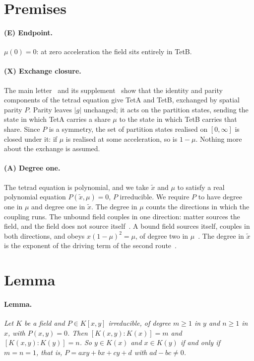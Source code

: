 \documentclass[twocolumn]{iopjournal}
\begin{document}
\section*{Premises}

\paragraph{(E) Endpoint.} $\mu(0) = 0$: at zero acceleration the
field sits entirely in TetB.

\paragraph{(X) Exchange closure.} The main
letter~\cite{Nelson2026geometry} and its
supplement~\cite{Nelson2026scheme} show that the identity and parity
components of the tetrad equation give TetA and TetB, exchanged by
spatial parity $P$. Parity leaves $|g|$ unchanged; it acts on the
partition states, sending the state in which TetA carries a share
$\mu$ to the state in which TetB carries that share. Since $P$ is a
symmetry, the set of partition states realised on $[0,\infty]$ is
closed under it: if $\mu$ is realised at some acceleration, so is
$1 - \mu$. Nothing more about the exchange is assumed.

\paragraph{(A) Degree one.} The tetrad equation is polynomial, and
we take $\tilde x$ and $\mu$ to satisfy a real polynomial equation
$P(\tilde x, \mu) = 0$, $P$ irreducible. We
require $P$ to have degree one in $\mu$ and degree one in
$\tilde x$. The degree in $\mu$ counts the directions in which the
coupling runs. The unbound field couples in one direction: matter
sources the field, and the field does not source
itself~\cite{Nelson2026bound}. A bound field sources itself, couples
in both directions, and obeys $x(1-\mu)^2 = \mu$, of degree two in
$\mu$~\cite{Nelson2026bound}. The degree in $\tilde x$ is the
exponent of the driving term of the second
route~\cite{Nelson2026equilibrium}.


\section*{Lemma}

\paragraph{Lemma.} \textit{Let $K$ be a field and $P \in K[x,y]$
irreducible, of degree $m \ge 1$ in $y$ and $n \ge 1$ in $x$, with
$P(x,y) = 0$. Then $[K(x,y):K(x)] = m$ and $[K(x,y):K(y)] = n$. So
$y \in K(x)$ and $x \in K(y)$ if and only if $m = n = 1$, that is,
$P = axy + bx + cy + d$ with $ad - bc \neq 0$.}
\end{document}
